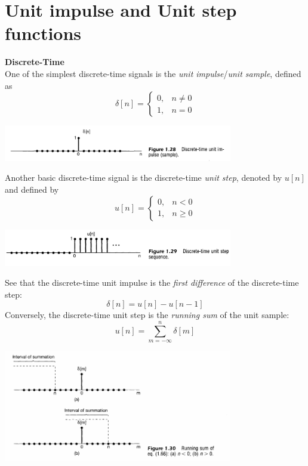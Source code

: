 \documentclass{report}
\begin{document}
\section{Unit impulse and Unit step functions}
\textbf{Discrete-Time}\\
One of the simplest discrete-time signals is the \textit{unit impulse}/\textit{unit sample}, defined as
\begin{equation*}
\delta[n]=\begin{cases}0,&n\neq0\\
1,&n=0\end{cases}
\end{equation*}
\begin{center}
\includegraphics[width=10cm]{a6}
\end{center}
Another basic discrete-time signal is the discrete-time \textit{unit step}, denoted by $u[n]$ and defined by
\begin{equation*}
u[n]=\begin{cases}
0,&n<0\\
1,&n\geq0\end{cases}
\end{equation*}
\begin{center}
\includegraphics[width=10cm]{a7}
\end{center}
See that the discrete-time unit impulse is the \textit{first difference} of the discrete-time step:
\begin{equation*}
\delta[n]=u[n]-u[n-1]
\end{equation*}
Conversely, the discrete-time unit step is the \textit{running sum} of the unit sample:
\begin{equation*}
u[n]=\sum^n_{m=-\infty}\delta[m]
\end{equation*}
\begin{center}
\includegraphics[width=10cm]{a8}
\end{center}
\end{document}
